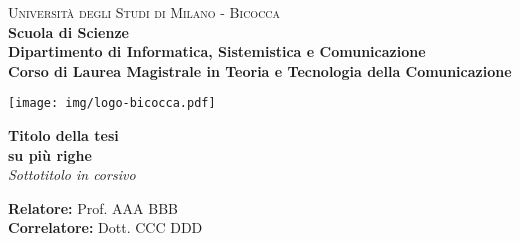     \begin{titlepage}
        
        \centering
        
        \begin{minipage}[t]{1\textwidth}
        	\centering
        {
                {\LARGE\textsc{Università degli Studi di Milano - Bicocca}} \\
                \Large\textbf{Scuola di Scienze} \\
                \large\textbf{Dipartimento di Informatica, Sistemistica e Comunicazione} \\
                \textbf{Corso di Laurea Magistrale in Teoria e Tecnologia della Comunicazione} \\
                \par
        }
        \end{minipage}
        
        \centering
        \begin{minipage}[t]{\textwidth}
        	\vspace{10mm}
        \end{minipage}
         
        \centering
        \begin{minipage}[t]{1\textwidth}
       	\centering
        \texttt{[image: img/logo-bicocca.pdf]}
        \end{minipage}
        
        \begin{minipage}[t]{\textwidth}
        \end{minipage}
        
		\vspace{10mm}
        
		\begin{center}
			\Huge{
				\textbf{Titolo della tesi \\ su più righe \\}
				}
			\Large{\textit{Sottotitolo in corsivo}}
		\end{center}
        
        \vspace{40mm}

        \begin{flushleft}
        

        \noindent
        {\large \textbf{Relatore:} Prof. AAA BBB } \\

        \noindent
        {\large \textbf{Correlatore:} Dott. CCC DDD}
        \end{flushleft}
        

\end{titlepage}
